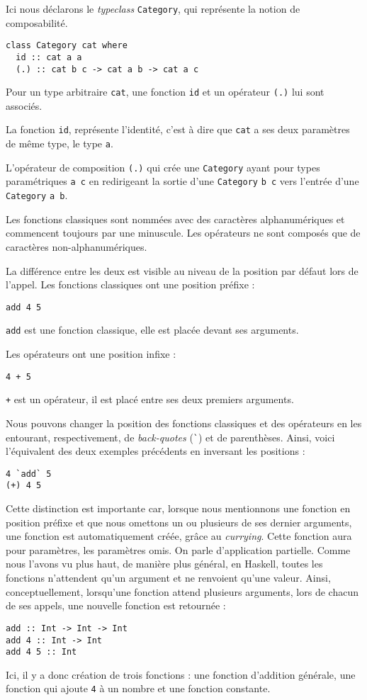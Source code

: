 \documentclass{llncs}
\begin{document}
Ici nous déclarons le \emph{typeclass} \lstinline{Category}, qui représente
la notion de composabilité.
\begin{lstlisting}
class Category cat where
  id :: cat a a
  (.) :: cat b c -> cat a b -> cat a c
\end{lstlisting}

Pour un type arbitraire \lstinline{cat}, une fonction \lstinline{id} et un opérateur \lstinline{(.)} lui sont
associés.

La fonction \lstinline{id}, représente l'identité, c'est à dire
que \lstinline{cat} a ses deux paramètres de même type, le type \lstinline{a}.

L'opérateur de composition \lstinline{(.)} qui crée une \lstinline{Category}
ayant pour types paramétriques \lstinline{a c} en redirigeant la sortie d'une
\lstinline{Category} \lstinline{b c} vers l'entrée d'une \lstinline{Category} \lstinline{a b}.

Les fonctions classiques sont nommées avec des caractères alphanumériques et commencent
toujours par une minuscule.
Les opérateurs ne sont composés que de caractères non-alphanumériques.

La différence entre les deux est visible au niveau de la position par défaut lors
de l'appel.
Les fonctions classiques ont une position préfixe :
\begin{lstlisting}
add 4 5
\end{lstlisting}

\lstinline{add} est une fonction classique, elle est placée devant ses
arguments.

Les opérateurs ont une position infixe :
\begin{lstlisting}
4 + 5
\end{lstlisting}

\lstinline{+} est un opérateur, il est placé entre ses deux premiers
arguments.

Nous pouvons changer la position des fonctions classiques et des opérateurs en
les entourant, respectivement, de \emph{back-quotes} (\lstinline{`}) et de parenthèses.
Ainsi, voici l'équivalent des deux exemples précédents en inversant les positions :
\begin{lstlisting}
4 `add` 5
(+) 4 5
\end{lstlisting}

Cette distinction est importante car, lorsque nous mentionnons une fonction en position
préfixe et que nous omettons un ou plusieurs de ses dernier arguments, une fonction
est automatiquement créée, grâce au \emph{currying}.
Cette fonction aura pour paramètres, les paramètres omis.
On parle d'application partielle.
Comme nous l'avons vu plus haut, de manière plus général, en Haskell, toutes les
fonctions n'attendent qu'un argument et ne renvoient qu'une valeur.
Ainsi, conceptuellement, lorsqu'une fonction attend plusieurs arguments, lors de
chacun de ses appels, une nouvelle fonction est retournée :
\begin{lstlisting}
add :: Int -> Int -> Int
add 4 :: Int -> Int
add 4 5 :: Int
\end{lstlisting}
Ici, il y a donc création de trois fonctions : une fonction d'addition générale,
une fonction qui ajoute \lstinline{4} à un nombre et une fonction constante.
\end{document}
